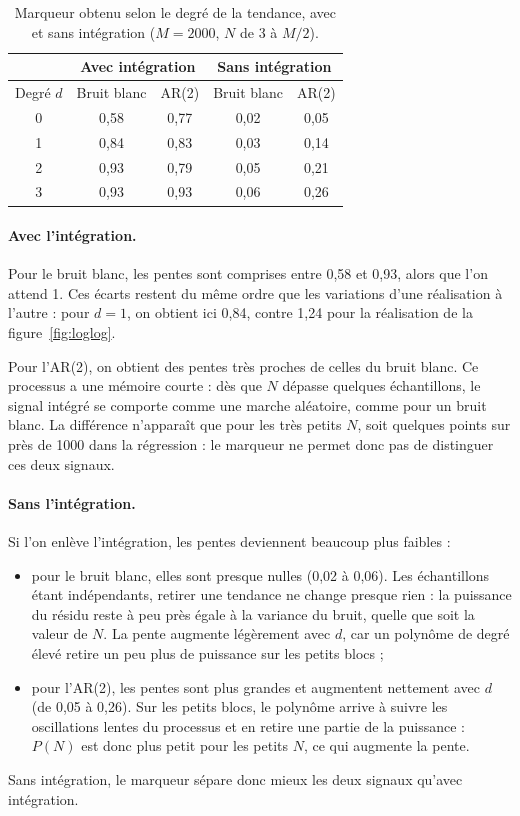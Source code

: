 \documentclass[11pt,a4paper]{article}
\begin{document}
\begin{table}[H]
  \centering
  \begin{tabular}{|c|c|c|c|c|}
    \hline
     & \multicolumn{2}{c|}{Avec intégration} & \multicolumn{2}{c|}{Sans intégration} \\
    \hline
    Degré $d$ & Bruit blanc & AR(2) & Bruit blanc & AR(2) \\
    \hline
    0 & 0,58 & 0,77 & 0,02 & 0,05 \\
    1 & 0,84 & 0,83 & 0,03 & 0,14 \\
    2 & 0,93 & 0,79 & 0,05 & 0,21 \\
    3 & 0,93 & 0,93 & 0,06 & 0,26 \\
    \hline
  \end{tabular}
  \caption{Marqueur obtenu selon le degré de la tendance, avec et sans intégration
  ($M = 2000$, $N$ de 3 à $M/2$).}
  \label{tab:pentes}
\end{table}

\paragraph{Avec l'intégration.} Pour le bruit blanc, les pentes sont comprises entre 0,58 et 0,93, alors que l'on attend
1. Ces écarts restent du même ordre que les variations d'une réalisation à l'autre : pour
$d = 1$, on obtient ici 0,84, contre 1,24 pour la réalisation de la
figure~\ref{fig:loglog}.

Pour l'AR(2), on obtient des pentes très proches de celles du bruit blanc. Ce processus
a une mémoire courte : dès que $N$ dépasse quelques échantillons, le signal intégré se
comporte comme une marche aléatoire, comme pour un bruit blanc. La différence n'apparaît
que pour les très petits $N$, soit quelques points sur près de 1000 dans la régression : le
marqueur ne permet donc pas de distinguer ces deux signaux.

\paragraph{Sans l'intégration.} Si l'on enlève l'intégration, les pentes deviennent beaucoup plus faibles :
\begin{itemize}
  \item pour le bruit blanc, elles sont presque nulles (0,02 à 0,06). Les échantillons étant
  indépendants, retirer une tendance ne change presque rien : la puissance du résidu reste à
  peu près égale à la variance du bruit, quelle que soit la valeur de $N$. La pente augmente
  légèrement avec $d$, car un polynôme de degré élevé retire un peu plus de puissance sur
  les petits blocs ;
  \item pour l'AR(2), les pentes sont plus grandes et augmentent nettement avec $d$ (de 0,05
  à 0,26). Sur les petits blocs, le polynôme arrive à suivre les oscillations lentes du
  processus et en retire une partie de la puissance : $P(N)$ est donc plus petit pour les
  petits $N$, ce qui augmente la pente.
\end{itemize}
Sans intégration, le marqueur sépare donc mieux les deux signaux qu'avec intégration.
\end{document}
